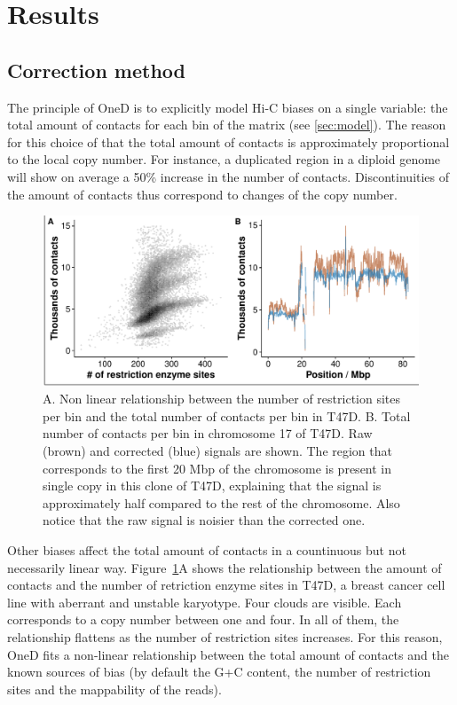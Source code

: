 \documentclass{bioinfo}
\begin{document}
\section{Results}

\subsection{Correction method}

The principle of OneD is to explicitly model Hi-C biases on a single
variable: the total amount of contacts for each bin of the matrix (see
\ref{sec:model}). The reason for this choice of that the total amount of
contacts is approximately proportional to the local copy number. For
instance, a duplicated region in a diploid genome will show on average a
50\% increase in the number of contacts. Discontinuities of the amount of
contacts thus correspond to changes of the copy number.

\begin{figure}[!tp]
\centerline{\includegraphics[width=.45\textwidth]{img/figure1.pdf}}
\caption{A. Non linear relationship between the number of restriction
sites per bin and the total number of contacts per bin in T47D. B. Total
number of contacts per bin in chromosome 17 of T47D. Raw (brown) and
corrected (blue) signals are shown. The region that corresponds to the
first 20 Mbp of the chromosome is present in single copy in this clone of
T47D, explaining that the signal is approximately half compared to the
rest of the chromosome.  Also notice that the raw signal is noisier than
the corrected one.}
\label{fig:totals}
\end{figure}

Other biases affect the total amount of contacts in a countinuous but not
necessarily linear way. Figure~\ref{fig:totals}A shows the relationship
between the amount of contacts and the number of retriction enzyme sites
in T47D, a breast cancer cell line with aberrant and unstable karyotype.
Four clouds are visible. Each corresponds to a copy number between one and
four. In all of them, the relationship flattens as the number of
restriction sites increases. For this reason, OneD fits a non-linear
relationship between the total amount of contacts and the known sources of
bias (by default the G+C content, the number of restriction sites and the
mappability of the reads).
\end{document}
